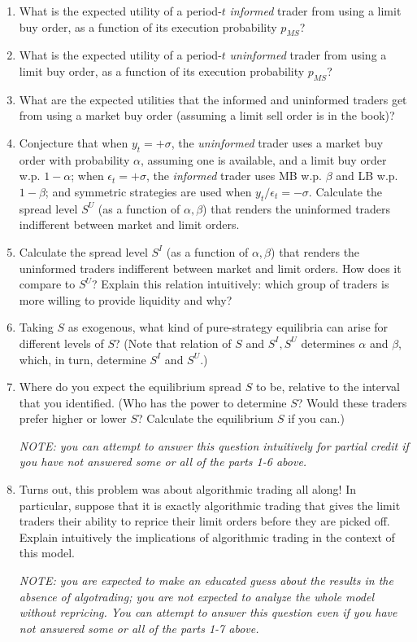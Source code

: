 \documentclass[a4paper]{article}
\begin{document}
	\begin{enumerate}
		\item What is the expected utility of a period-$t$ \emph{informed} trader from using a limit buy order, as a function of its execution probability $p_{MS}$?
		
		\item What is the expected utility of a period-$t$ \emph{uninformed} trader from using a limit buy order, as a function of its execution probability $p_{MS}$?
		
		\item What are the expected utilities that the informed and uninformed traders get from using a market buy order (assuming a limit sell order is in the book)?
		
		\item Conjecture that when $y_t=+\sigma$, the \emph{uninformed} trader uses a market buy order with probability $\alpha$, assuming one is available, and a limit buy order w.p. $1-\alpha$; when $\epsilon_t=+\sigma$, the \emph{informed} trader uses MB w.p. $\beta$ and LB w.p. $1-\beta$; and symmetric strategies are used when $y_t/\epsilon_t=-\sigma$. Calculate the spread level $S^U$ (as a function of $\alpha,\beta$) that renders the uninformed traders indifferent between market and limit orders.
		
		\item Calculate the spread level $S^I$ (as a function of $\alpha,\beta$) that renders the uninformed traders indifferent between market and limit orders. How does it compare to $S^U$? Explain this relation intuitively: which group of traders is more willing to provide liquidity and why?
		
		\item Taking $S$ as exogenous, what kind of pure-strategy equilibria can arise for different levels of $S$? (Note that relation of $S$ and $S^I,S^U$ determines $\alpha$ and $\beta$, which, in turn, determine $S^I$ and $S^U$.)
		
		\item Where do you expect the equilibrium spread $S$ to be, relative to the interval that you identified. (Who has the power to determine $S$? Would these traders prefer higher or lower $S$? Calculate the equilibrium $S$ if you can.)
		
		\emph{NOTE: you can attempt to answer this question intuitively for partial credit if you have not answered some or all of the parts 1-6 above.}
		
		\item Turns out, this problem was about algorithmic trading all along! In particular, suppose that it is exactly algorithmic trading that gives the limit traders their ability to reprice their limit orders before they are picked off. Explain intuitively the implications of algorithmic trading in the context of this model.
		
		\emph{NOTE: you are expected to make an educated guess about the results in the absence of algotrading; you are not expected to analyze the whole model without repricing. You can attempt to answer this question even if you have not answered some or all of the parts 1-7 above.}
	\end{enumerate}
	
\end{document}
